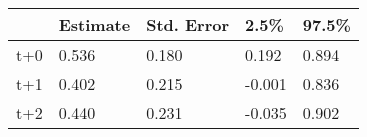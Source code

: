 \begin{tabular}{lllll}
  \toprule
  & Estimate & Std. Error & 2.5\% & 97.5\% \\ 
  \midrule
t+0 & 0.536 & 0.180 & 0.192 & 0.894 \\ 
  t+1 & 0.402 & 0.215 & -0.001 & 0.836 \\ 
  t+2 & 0.440 & 0.231 & -0.035 & 0.902 \\ 
   \bottomrule
\end{tabular}
